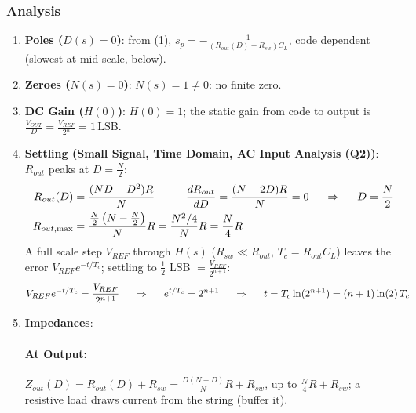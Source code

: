 \subsubsection{Analysis}
\begin{enumerate}
  \item \textbf{Poles (\(D(s) = 0\))}: from (1),
    \(s_p = -\frac{1}{(R_{out}(D) + R_{sw}) C_L}\), code dependent (slowest at mid scale, below).
  \item \textbf{Zeroes (\(N(s) = 0\))}: \(N(s) = 1 \neq 0\): no finite zero.
  \item \textbf{DC Gain (\(H(0)\))}: \(H(0) = 1\); the static gain from code to output is
    \(\frac{V_{OUT}}{D} = \frac{V_{REF}}{2^n} = 1\,\text{LSB}\).
  \item \textbf{Settling (Small Signal, Time Domain, AC Input Analysis (Q2))}:
    \(R_{out}\) peaks at \(D = \frac{N}{2}\):
    \begin{align*}
      R_{out}(D) &= \frac{(N D - D^2) R}{N} \hspace{1cm}
      \frac{dR_{out}}{dD} = \frac{(N - 2D)R}{N} = 0 \hspace{0.5cm} \Rightarrow \hspace{0.5cm} D = \frac{N}{2} \\
      R_{out,\max} &= \frac{\frac{N}{2}\left(N - \frac{N}{2}\right)}{N} R = \frac{N^2/4}{N} R = \frac{N}{4} R
    \end{align*}
    A full scale step \(V_{REF}\) through \(H(s)\) (\(R_{sw} \ll R_{out}\),
    \(T_c = R_{out} C_L\)) leaves the error \(V_{REF} e^{-t/T_c}\); settling to
    \(\frac{1}{2}\) LSB \(= \frac{V_{REF}}{2^{n+1}}\):
    \begin{align*}
      V_{REF} e^{-t/T_c} &= \frac{V_{REF}}{2^{n+1}} \hspace{0.5cm} \Rightarrow \hspace{0.5cm}
      e^{t/T_c} = 2^{n+1} \hspace{0.5cm} \Rightarrow \hspace{0.5cm}
      t = T_c \ln(2^{n+1}) = (n + 1) \ln(2)\, T_c
    \end{align*}
  \item \textbf{Impedances}:
    \paragraph{At Output:} \(Z_{out}(D) = R_{out}(D) + R_{sw} = \frac{D(N - D)}{N} R + R_{sw}\), up to \(\frac{N}{4} R + R_{sw}\);
    a resistive load draws current from the string (buffer it).

\end{enumerate}
